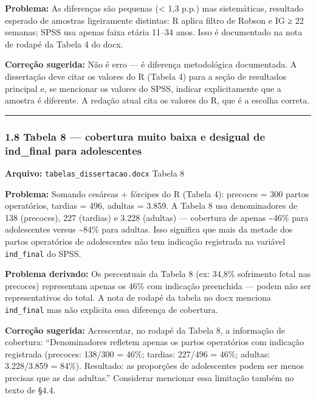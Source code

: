 \documentclass[
]{article}
\begin{document}
\textbf{Problema:} As diferenças são pequenas (\textless{} 1,3 p.p.) mas
sistemáticas, resultado esperado de amostras ligeiramente distintas: R
aplica filtro de Robson e IG ≥ 22 semanas; SPSS usa apenas faixa etária
11--34 anos. Isso é documentado na nota de rodapé da Tabela 4 do docx.

\textbf{Correção sugerida:} Não é erro --- é diferença metodológica
documentada. A dissertação deve citar os valores do R (Tabela 4) para a
seção de resultados principal e, se mencionar os valores do SPSS,
indicar explicitamente que a amostra é diferente. A redação atual cita
os valores do R, que é a escolha correta.

\begin{center}\rule{0.5\linewidth}{0.5pt}\end{center}

\hypertarget{tabela-8-cobertura-muito-baixa-e-desigual-de-ind_final-para-adolescentes}{%
\subsubsection{1.8 Tabela 8 --- cobertura muito baixa e desigual de
ind\_final para
adolescentes}\label{tabela-8-cobertura-muito-baixa-e-desigual-de-ind_final-para-adolescentes}}

\textbf{Arquivo:} \texttt{tabelas\_dissertacao.docx} Tabela 8

\textbf{Problema:} Somando cesáreas + fórcipes do R (Tabela 4): precoces
= 300 partos operatórios, tardias = 496, adultas = 3.859. A Tabela 8 usa
denominadores de 138 (precoces), 227 (tardias) e 3.228 (adultas) ---
cobertura de apenas \textasciitilde46\% para adolescentes versus
\textasciitilde84\% para adultas. Isso significa que mais da metade dos
partos operatórios de adolescentes não tem indicação registrada na
variável \texttt{ind\_final} do SPSS.

\textbf{Problema derivado:} Os percentuais da Tabela 8 (ex: 34,8\%
sofrimento fetal nas precoces) representam apenas os 46\% com indicação
preenchida --- podem não ser representativos do total. A nota de rodapé
da tabela no docx menciona \texttt{ind\_final} mas não explicita essa
diferença de cobertura.

\textbf{Correção sugerida:} Acrescentar, no rodapé da Tabela 8, a
informação de cobertura: ``Denominadores refletem apenas os partos
operatórios com indicação registrada (precoces: 138/300 = 46\%; tardias:
227/496 = 46\%; adultas: 3.228/3.859 = 84\%). Resultado: as proporções
de adolescentes podem ser menos precisas que as das adultas.''
Considerar mencionar essa limitação também no texto de §4.4.
\end{document}
